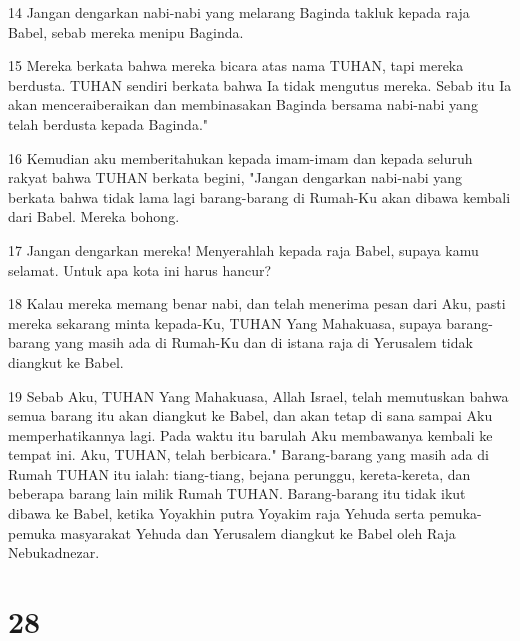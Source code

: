 \par 14 Jangan dengarkan nabi-nabi yang melarang Baginda takluk kepada raja Babel, sebab mereka menipu Baginda.
\par 15 Mereka berkata bahwa mereka bicara atas nama TUHAN, tapi mereka berdusta. TUHAN sendiri berkata bahwa Ia tidak mengutus mereka. Sebab itu Ia akan menceraiberaikan dan membinasakan Baginda bersama nabi-nabi yang telah berdusta kepada Baginda."
\par 16 Kemudian aku memberitahukan kepada imam-imam dan kepada seluruh rakyat bahwa TUHAN berkata begini, "Jangan dengarkan nabi-nabi yang berkata bahwa tidak lama lagi barang-barang di Rumah-Ku akan dibawa kembali dari Babel. Mereka bohong.
\par 17 Jangan dengarkan mereka! Menyerahlah kepada raja Babel, supaya kamu selamat. Untuk apa kota ini harus hancur?
\par 18 Kalau mereka memang benar nabi, dan telah menerima pesan dari Aku, pasti mereka sekarang minta kepada-Ku, TUHAN Yang Mahakuasa, supaya barang-barang yang masih ada di Rumah-Ku dan di istana raja di Yerusalem tidak diangkut ke Babel.
\par 19 Sebab Aku, TUHAN Yang Mahakuasa, Allah Israel, telah memutuskan bahwa semua barang itu akan diangkut ke Babel, dan akan tetap di sana sampai Aku memperhatikannya lagi. Pada waktu itu barulah Aku membawanya kembali ke tempat ini. Aku, TUHAN, telah berbicara." Barang-barang yang masih ada di Rumah TUHAN itu ialah: tiang-tiang, bejana perunggu, kereta-kereta, dan beberapa barang lain milik Rumah TUHAN. Barang-barang itu tidak ikut dibawa ke Babel, ketika Yoyakhin putra Yoyakim raja Yehuda serta pemuka-pemuka masyarakat Yehuda dan Yerusalem diangkut ke Babel oleh Raja Nebukadnezar.

\chapter{28}


